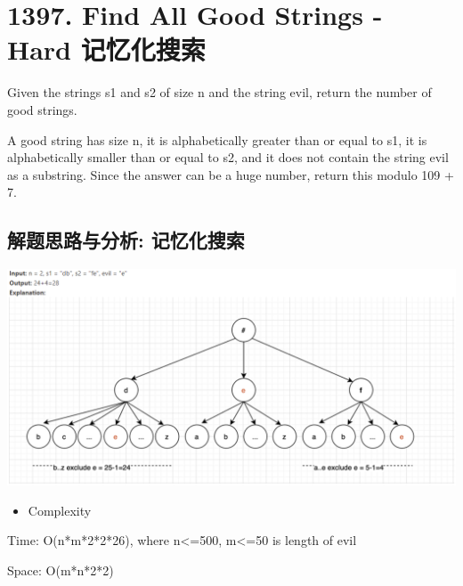 \documentclass[9pt, b5paaper]{book}
\begin{document}
\section{1397. Find All Good Strings - Hard 记忆化搜索}
\label{sec-15-3}
Given the strings s1 and s2 of size n and the string evil, return the number of good strings.

A good string has size n, it is alphabetically greater than or equal to s1, it is alphabetically smaller than or equal to s2, and it does not contain the string evil as a substring. Since the answer can be a huge number, return this modulo 109 + 7.
\subsection{解题思路与分析: 记忆化搜索}
\label{sec-15-3-1}

\includegraphics[width=.9\linewidth]{./pic/goodString.png}

\begin{itemize}
\item Complexity
\end{itemize}

Time: O(n*m*2*2*26), where n<=500, m<=50 is length of evil

Space: O(m*n*2*2)
\end{document}
